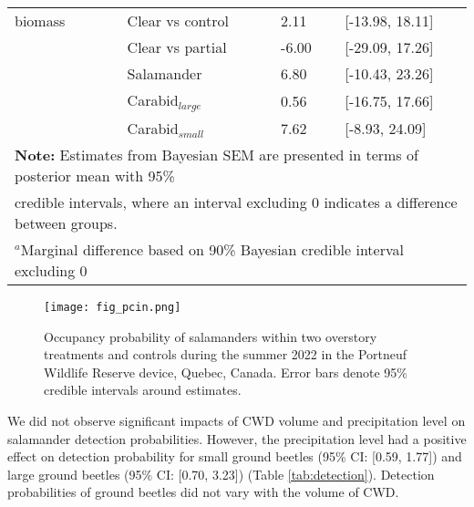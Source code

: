\begin{table}[h!]
\begin{tabular}{lllll}
      biomass             && Clear vs control  & \hspace{1mm}2.11 & [-13.98, 18.11] \\ 
                          && Clear vs partial  & -6.00 & [-29.09, 17.26] \\  
                          && Salamander        & \hspace{1mm}6.80 & [-10.43, 23.26] \\ 
                          && Carabid$_{large}$      & \hspace{1mm}0.56 & [-16.75, 17.66] \\ 
                          && Carabid$_{small}$      & \hspace{1mm}7.62 & [-8.93, 24.09] \\ 
      \hline
      \multicolumn{5}{l}{\textbf{Note:} Estimates from Bayesian SEM are presented in terms of posterior mean with 95\%} \\
      \multicolumn{5}{l}{credible intervals, where an interval excluding 0 indicates a difference between groups.} \\
      \multicolumn{5}{l}{$^{a}$Marginal difference based on 90\% Bayesian credible interval excluding 0}
  \end{tabular}
\end{table}

\pagebreak

\begin{figure}[h!]
  \centering
  \texttt{[image: fig\_pcin.png]}
  \caption[Occupancy probability of salamanders under overstory treatments]
  {Occupancy probability of salamanders within two overstory treatments and controls during the summer 2022 in the Portneuf Wildlife Reserve device, Quebec, Canada. 
  Error bars denote 95\% credible intervals around estimates.}
  \label{fig:pcin}
\end{figure}

\vspace{10pt}

\clearpage

We did not observe significant impacts of CWD volume and precipitation level on salamander detection probabilities. 
However, the precipitation level had a positive effect on detection probability for small ground beetles (95\% CI: [0.59, 1.77]) and large ground beetles (95\% CI: [0.70, 3.23]) (Table \ref{tab:detection}). 
Detection probabilities of ground beetles did not vary with the volume of CWD.

